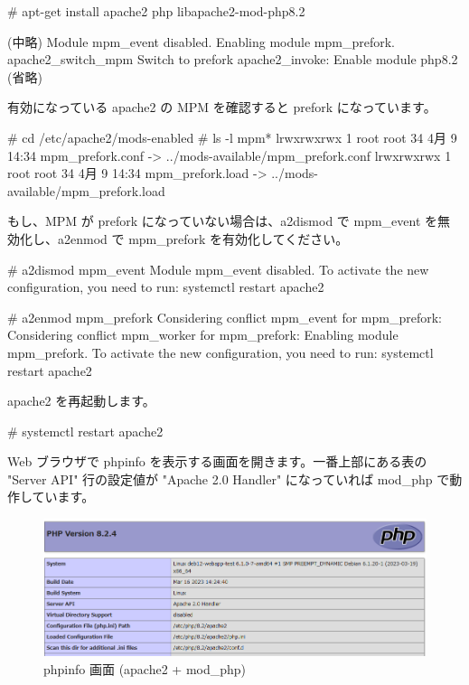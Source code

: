 \documentclass[mingoth,a4paper]{jsarticle}
\begin{document}
\begin{commandline}
# apt-get install apache2 php libapache2-mod-php8.2

  (中略)
Module mpm_event disabled.
Enabling module mpm_prefork.
apache2_switch_mpm Switch to prefork
apache2_invoke: Enable module php8.2
  (省略)
\end{commandline}

有効になっている apache2 の MPM を確認すると prefork になっています。

\begin{commandline}
# cd /etc/apache2/mods-enabled
# ls -l mpm*
lrwxrwxrwx 1 root root 34  4月  9 14:34 mpm_prefork.conf -> ../mods-available/mpm_prefork.conf
lrwxrwxrwx 1 root root 34  4月  9 14:34 mpm_prefork.load -> ../mods-available/mpm_prefork.load
\end{commandline}

もし、MPM が prefork になっていない場合は、a2dismod で mpm\_event を無効化し、a2enmod で mpm\_prefork を有効化してください。

\begin{commandline}
# a2dismod mpm_event
Module mpm_event disabled.
To activate the new configuration, you need to run:
  systemctl restart apache2

# a2enmod mpm_prefork
Considering conflict mpm_event for mpm_prefork:
Considering conflict mpm_worker for mpm_prefork:
Enabling module mpm_prefork.
To activate the new configuration, you need to run:
  systemctl restart apache2
\end{commandline}

apache2 を再起動します。

\begin{commandline}
# systemctl restart apache2
\end{commandline}

Web ブラウザで phpinfo を表示する画面を開きます。一番上部にある表の "Server API" 行の設定値が "Apache 2.0 Handler" になっていれば mod\_php で動作しています。

\begin{center}
  \begin{figure}[htbp]
    \includegraphics[width=1.00\hsize]{image202304/phpinfo_apache2-mod_php.png}
    \caption{phpinfo 画面 (apache2 + mod\_php)}
  \end{figure}
\end{center}
\end{document}
